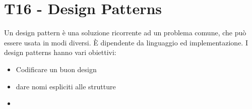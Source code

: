 \documentclass{article}
\begin{document}
\section{T16 - Design Patterns}

Un design pattern è una soluzione ricorrente ad un problema comune, che può essere usata
in modi diversi. È dipendente da linguaggio ed implementazione. I design patterns hanno vari obiettivi:
\begin{itemize}
    \item Codificare un buon design
    \item dare nomi espliciti alle strutture
    \item 
\end{itemize}
\end{document}
